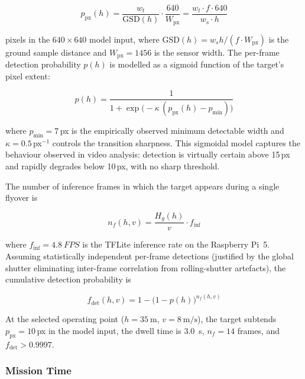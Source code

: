 \begin{equation}\label{eq:target-px-app}
  p_{\mathrm{px}}(h) = \frac{w_t}{\mathrm{GSD}(h)} \cdot \frac{640}{W_{\mathrm{px}}} = \frac{w_t \cdot f \cdot 640}{w_s \cdot h}
\end{equation}

\noindent pixels in the $640 \times 640$ model input, where $\mathrm{GSD}(h) = w_s h / (f \cdot W_{\mathrm{px}})$ is the ground sample distance and $W_{\mathrm{px}} = 1456$ is the sensor width. The per-frame detection probability $p(h)$ is modelled as a sigmoid function of the target's pixel extent:

\begin{equation}\label{eq:p-single}
  p(h) = \frac{1}{1 + \exp\!\bigl(-\kappa\,(p_{\mathrm{px}}(h) - p_{\mathrm{min}})\bigr)}
\end{equation}

\noindent where $p_{\mathrm{min}} = 7$\,px is the empirically observed minimum detectable width and $\kappa = 0.5$\,px$^{-1}$ controls the transition sharpness. This sigmoidal model captures the behaviour observed in video analysis: detection is virtually certain above 15\,px and rapidly degrades below 10\,px, with no sharp threshold.

The number of inference frames in which the target appears during a single flyover is

\begin{equation}\label{eq:n-frames}
  n_f(h, v) = \frac{H_g(h)}{v} \cdot f_{\mathrm{inf}}
\end{equation}

\noindent where $f_{\mathrm{inf}} = \SI{4.8}{FPS}$ is the TFLite inference rate on the Raspberry Pi~5. Assuming statistically independent per-frame detections (justified by the global shutter eliminating inter-frame correlation from rolling-shutter artefacts), the cumulative detection probability is

\begin{equation}\label{eq:p-detect}
  f_{\mathrm{det}}(h, v) = 1 - \bigl(1 - p(h)\bigr)^{n_f(h,v)}
\end{equation}

\noindent At the selected operating point ($h = \SI{35}{\metre}$, $v = \SI{8}{\metre\per\second}$), the target subtends $p_{\mathrm{px}} = 10$\,px in the model input, the dwell time is \SI{3.0}{\second}, $n_f = 14$ frames, and $f_{\mathrm{det}} > 0.9997$.

\subsubsection{Mission Time}\label{sec:obj-time}

